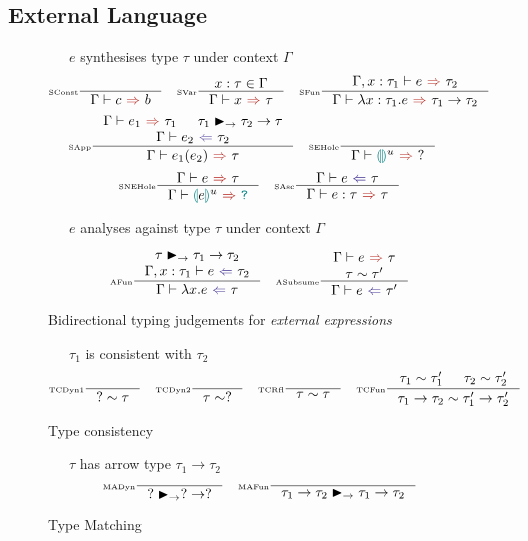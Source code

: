 \subsection{External Language}
\begin{figure}[H]
\small
{}\ \ \ $e$ synthesises type $\tau$ under context $\Gamma$
\tiny
\[\inference[\tiny SConst]{}{\synthesis{c}{b}} \quad
\inference[\tiny SVar]{x : \tau \in \Gamma}{\synthesis{x}{\tau}} \quad 
\inference[\tiny SFun]{\synthesis[\Gamma,x:\tau_1]{e}{\tau_2}}{\synthesis{\lambda x:\tau_1.e}{\tau_1 \to \tau_2}}\]
\[\inference[\tiny SApp]{\synthesis{e_1}{\tau_1} & \tau_1 \funmatch \tau_2 \to \tau \\ \analysis{e_2}{\tau_2}}{\synthesis{e_1(e_2)}{\tau}} \quad 
\inference[\tiny SEHole]{}{\synthesis{\hole^u}{?}} \quad \]
\[\inference[\tiny SNEHole]{\synthesis{e}{\tau}}{\synthesis{\hole[e]^u}{\dyn}}\quad 
\inference[\tiny SAsc]{\analysis{e}{\tau}}{\synthesis{e : \tau}{\tau}}\]

\small
{}\ \ \ $e$ analyses against type $\tau$ under context $\Gamma$

\tiny
\[\inference[\tiny AFun]{\tau \funmatch \tau_1 \to \tau_2\\ \analysis[\Gamma, x:\tau_1]{e}{\tau_2}}{\analysis{\lambda x.e}{\tau}} \quad 
\inference[\tiny ASubsume]{\synthesis{e}{\tau}\\ \tau \sim \tau'}{\analysis{e}{\tau'}}\]

\caption{Bidirectional typing judgements for \textit{external expressions}}
\label{fig:typing}
\end{figure} 


\begin{figure}[H]
\small
{}\ \ \ $\tau_1$ is consistent with $\tau_2$
\tiny
\[\inference[\tiny TCDyn1]{}{? \sim \tau} \quad \inference[\tiny TCDyn2]{}{\tau \sim ?} \quad \inference[\tiny TCRfl]{}{\tau \sim \tau} \quad \inference[\tiny TCFun]{\tau_1 \sim \tau_1' & \tau_2 \sim \tau_2'}{\tau_1 \to \tau_2 \sim \tau_1' \to \tau_2'}\]
\caption{Type consistency}
\label{fig:consistency}
\end{figure}

\begin{figure}[h]
\small
{}\ \ \ $\tau$ has arrow type $\tau_1 \to \tau_2$
\tiny
\[\inference[\tiny MADyn]{}{? \funmatch ? \to ?} \quad 
\inference[\tiny MAFun]{}{\tau_1 \to \tau_2 \funmatch \tau_1 \to \tau_2}\]
\caption{Type Matching}
\label{fig:typematching}
\end{figure}


